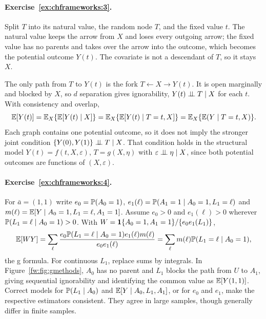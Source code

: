 \paragraph{Exercise~\ref{ex:chframeworks:3}.} Split $T$ into its natural value, the random node $T$, and the fixed value $t$. The natural value keeps the arrow from $X$ and loses every outgoing arrow; the fixed value has no parents and takes over the arrow into the outcome, which becomes the potential outcome $Y(t)$. The covariate is not a descendant of $T$, so it stays $X$.
\begin{center}
\end{center}
The only path from $T$ to $Y(t)$ is the fork $T\leftarrow X\rightarrow Y(t)$. It is open marginally and blocked by $X$, so $d$ separation gives ignorability, $Y(t)\perp\!\!\!\perp T\mid X$ for each $t$. With consistency and overlap,
\[
\mathbb{E}[Y(t)]=\mathbb{E}_X\{\mathbb{E}[Y(t)\mid X]\}=\mathbb{E}_X\{\mathbb{E}[Y(t)\mid T=t,X]\}=\mathbb{E}_X\{\mathbb{E}(Y\mid T=t,X)\}.
\]
Each graph contains one potential outcome, so it does not imply the stronger joint condition $\{Y(0),Y(1)\}\perp\!\!\!\perp T\mid X$. That condition holds in the structural model $Y(t)=f(t,X,\varepsilon)$, $T=g(X,\eta)$ with $\varepsilon\perp\!\!\!\perp\eta\mid X$, since both potential outcomes are functions of $(X,\varepsilon)$.

\paragraph{Exercise~\ref{ex:chframeworks:4}.} For $\bar a=(1,1)$ write $e_0=\mathbb{P}(A_0=1)$, $e_1(\ell)=\mathbb{P}(A_1=1\mid A_0=1,L_1=\ell)$ and $m(\ell)=\mathbb{E}[Y\mid A_0=1,L_1=\ell,A_1=1]$. Assume $e_0>0$ and $e_1(\ell)>0$ wherever $\mathbb{P}(L_1=\ell\mid A_0=1)>0$. With $W=\mathbf{1}\{A_0=1,A_1=1\}/\{e_0e_1(L_1)\}$,
\[
\mathbb{E}[WY]=\sum_\ell\frac{e_0\mathbb{P}(L_1=\ell\mid A_0=1)e_1(\ell)m(\ell)}{e_0e_1(\ell)}=\sum_\ell m(\ell)\mathbb{P}(L_1=\ell\mid A_0=1),
\]
the g formula. For continuous $L_1$, replace sums by integrals. In Figure~\ref{fw:fig:gmethods}, $A_0$ has no parent and $L_1$ blocks the path from $U$ to $A_1$, giving sequential ignorability and identifying the common value as $\mathbb{E}[Y(1,1)]$. Correct models for $\mathbb{P}(L_1\mid A_0)$ and $\mathbb{E}[Y\mid A_0,L_1,A_1]$, or for $e_0$ and $e_1$, make the respective estimators consistent. They agree in large samples, though generally differ in finite samples.

